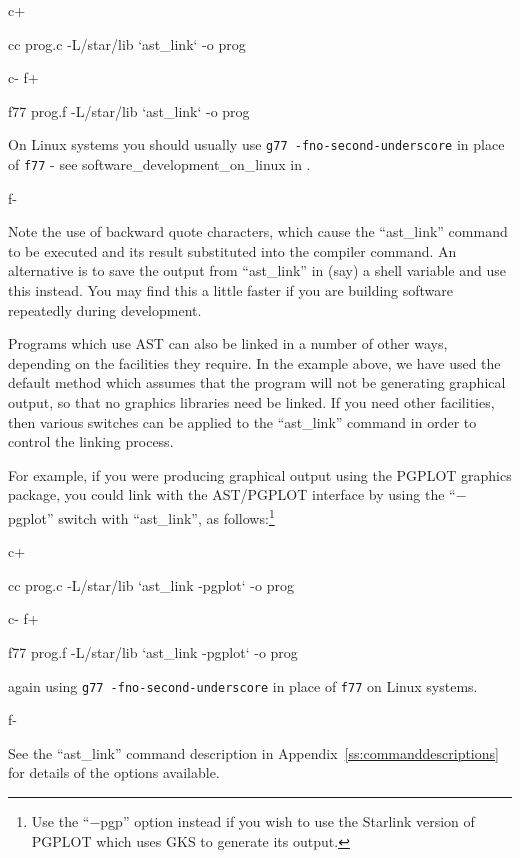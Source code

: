 \documentclass[twoside,11pt]{starlink}
\providecommand{\appref}[1]{Appendix~\ref{#1}}
\begin{document}
c+
\small
\begin{terminalv}
cc prog.c -L/star/lib `ast_link` -o prog
\end{terminalv}
\normalsize
c-
f+
\small
\begin{terminalv}
f77 prog.f -L/star/lib `ast_link` -o prog
\end{terminalv}
\normalsize

On Linux systems you should usually use \verb+g77 -fno-second-underscore+ in
place of \verb+f77+ - see 
{software_development_on_linux} in .

f-

Note the use of backward quote characters, which cause the
``ast\_link'' command to be executed and its result substituted into
the compiler command. An alternative is to save the output from
``ast\_link'' in (say) a shell variable and use this instead. You may
find this a little faster if you are building software repeatedly
during development.

Programs which use AST can also be linked in a number of other ways,
depending on the facilities they require. In the example above, we
have used the default method which assumes that the program will not
be generating graphical output, so that no graphics libraries need be
linked. If you need other facilities, then various switches can be
applied to the ``ast\_link'' command in order to control the linking
process.

For example, if you were producing graphical output using the PGPLOT
graphics package, you could link with the AST/PGPLOT interface by
using the ``$-$pgplot'' switch with ``ast\_link'', as
follows:\footnote{Use the ``$-$pgp'' option instead if you wish to use
the Starlink version of PGPLOT which uses GKS to generate its output.}

c+
\small
\begin{terminalv}
cc prog.c -L/star/lib `ast_link -pgplot` -o prog
\end{terminalv}
\normalsize
c-
f+
\begin{small}
\begin{terminalv}
f77 prog.f -L/star/lib `ast_link -pgplot` -o prog
\end{terminalv}
\end{small}

again using \verb+g77 -fno-second-underscore+ in place of \verb+f77+
on Linux systems.

f-

See the ``ast\_link'' command description in
\appref{ss:commanddescriptions} for details of the options available.
\end{document}

